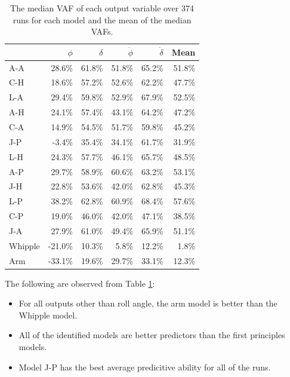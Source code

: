 \documentclass[a4paper]{article}
\begin{document}
\begin{table}
  \label{tab:MedianVAFOutputs}
  \caption{The median VAF of each output variable over 374 runs for each model
  and the mean of the median VAFs.}
  \centering
  \begin{tabular}{lrrrrr}
            & $\phi$   & $\delta$ & $\dot{\phi}$ & $\dot{\delta}$ & Mean   \\
    \hline
    A-A     & 28.6\%   & 61.8\%   & 51.8\%      & 65.2\%          & 51.8\% \\
    C-H     & 18.6\%   & 57.2\%   & 52.6\%      & 62.2\%          & 47.7\% \\
    L-A     & 29.4\%   & 59.8\%   & 52.9\%      & 67.9\%          & 52.5\% \\
    A-H     & 24.1\%   & 57.4\%   & 43.1\%      & 64.2\%          & 47.2\% \\
    C-A     & 14.9\%   & 54.5\%   & 51.7\%      & 59.8\%          & 45.2\% \\
    J-P     & -3.4\%   & 35.4\%   & 34.1\%      & 61.7\%          & 31.9\% \\
    L-H     & 24.3\%   & 57.7\%   & 46.1\%      & 65.7\%          & 48.5\% \\
    A-P     & 29.7\%   & 58.9\%   & 60.6\%      & 63.2\%          & 53.1\% \\
    J-H     & 22.8\%   & 53.6\%   & 42.0\%      & 62.8\%          & 45.3\% \\
    L-P     & 38.2\%   & 62.8\%   & 60.9\%      & 68.4\%          & 57.6\% \\
    C-P     & 19.0\%   & 46.0\%   & 42.0\%      & 47.1\%          & 38.5\% \\
    J-A     & 27.9\%   & 61.0\%   & 49.4\%      & 65.9\%          & 51.1\% \\
    Whipple & -21.0\%  & 10.3\%   & 5.8\%       & 12.2\%          &  1.8\% \\
    Arm     & -33.1\%  & 19.6\%   & 29.7\%      & 33.1\%          & 12.3\% \\
  \end{tabular}
\end{table}

The following are observed from Table \ref{tab:MedianVAFOutputs}:

\begin{itemize}
  \item
    For all outputs other than roll angle, the arm model is better than
    the Whipple model.
  \item
    All of the identified models are better predictors than the first
    principles models.
  \item
    Model J-P has the best average predicitive ability for all of the runs.
\end{itemize}
\end{document}
